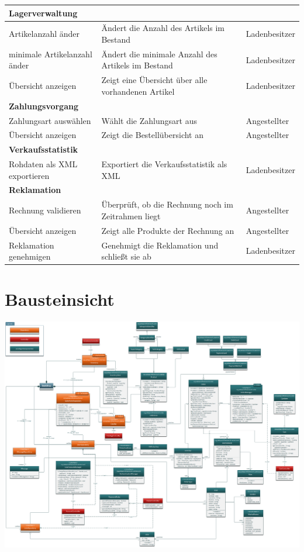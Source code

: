 \documentclass[pdftex,12pt,a4paper]{article}
\begin{document}
\newpage
\begin{tabular}{|p{\third}|p{\third}|p{\third}|} \hline
\multicolumn{3}{|l|}{\textbf{Lagerverwaltung}}\\ \hline
Artikelanzahl \"ander & \"Andert die Anzahl des Artikels im Bestand & Ladenbesitzer\\ \hline
minimale Artikelanzahl \"ander & \"Andert die  minimale Anzahl des Artikels im Bestand & Ladenbesitzer \\ \hline
\"Ubersicht anzeigen & Zeigt eine \"Ubersicht \"uber alle vorhandenen Artikel & Ladenbesitzer\\ \hline
\multicolumn{3}{|l|}{\textbf{Zahlungsvorgang}}\\ \hline
Zahlungsart ausw\"ahlen & W\"ahlt die Zahlungsart aus & Angestellter\\ \hline
\"Ubersicht anzeigen & Zeigt die Bestell\"ubersicht an & Angestellter\\ \hline
\multicolumn{3}{|l|}{\textbf{Verkaufsstatistik}}\\ \hline
Rohdaten als XML exportieren & Exportiert die Verkaufsstatistik als XML & Ladenbesitzer\\ \hline
\multicolumn{3}{|l|}{\textbf{Reklamation}}\\ \hline
Rechnung validieren & \"Uberpr\"uft, ob die Rechnung noch im Zeitrahmen liegt & Angestellter\\ \hline
\"Ubersicht anzeigen & Zeigt alle Produkte der Rechnung an & Angestellter\\ \hline
Reklamation genehmigen & Genehmigt die Reklamation und schlie\ss{}t sie ab & Ladenbesitzer\\ \hline
\end{tabular}

\section{Bausteinsicht}
\includegraphics[width=1\textwidth]{../../Entwurf/ekd_ood}
\end{document}
